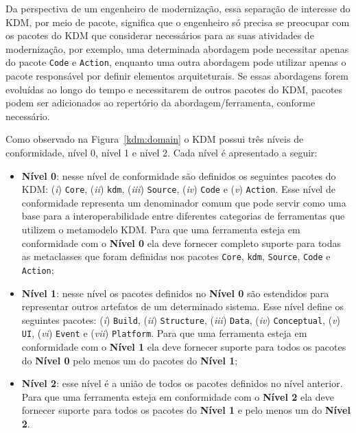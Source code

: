 Da perspectiva de um engenheiro de modernização, essa separação de interesse do KDM, por meio de pacote, significa que o engenheiro só precisa se preocupar com os pacotes do KDM que considerar necessários para as suas atividades de modernização, por exemplo, uma determinada abordagem pode necessitar apenas do pacote \texttt{Code} e \texttt{Action}, enquanto uma outra abordagem pode utilizar apenas o pacote responsável por definir elementos arquiteturais. Se essas abordagens forem evoluídas ao longo do tempo e necessitarem de outros pacotes do KDM, pacotes podem ser adicionados ao repertório da abordagem/ferramenta, conforme necessário.

Como observado na Figura~\ref{kdm:domain} o KDM possui três níveis de conformidade, nível 0, nível 1 e nível 2. Cada nível é apresentado a seguir:

\begin{itemize}
    \item \textbf{Nível 0}: nesse nível de conformidade são definidos os seguintes pacotes do KDM: (\textit{i})     \texttt{Core}, (\textit{ii}) \texttt{kdm}, (\textit{iii}) \texttt{Source}, (\textit{iv}) \texttt{Code} e (\textit{v}) \texttt{Action}. Esse nível de conformidade representa um denominador comum que pode servir como uma base para a interoperabilidade entre diferentes categorias de ferramentas que utilizem o metamodelo KDM. Para que uma ferramenta esteja em conformidade com o \textbf{Nível 0} ela deve fornecer completo suporte para todas as metaclasses que foram definidas nos pacotes \texttt{Core}, \texttt{kdm}, \texttt{Source}, \texttt{Code} e \texttt{Action};
    \item \textbf{Nível 1}: nesse nível os pacotes definidos no \textbf{Nível 0} são estendidos para representar outros artefatos de um determinado sistema. Esse nível define os seguintes pacotes: (\textit{i}) \texttt{Build}, (\textit{ii}) \texttt{Structure}, (\textit{iii}) \texttt{Data}, (\textit{iv}) \texttt{Conceptual}, (\textit{v}) \texttt{UI}, (\textit{vi}) \texttt{Event} e (\textit{vii}) \texttt{Platform}. Para que uma ferramenta esteja em conformidade com o \textbf{Nível 1} ela deve fornecer suporte para todos os pacotes do \textbf{Nível 0} pelo menos um do pacotes do \textbf{Nível 1};
    \item \textbf{Nível 2}: esse nível é a união de todos os pacotes definidos no nível anterior. Para que uma ferramenta esteja em conformidade com o \textbf{Nível 2} ela deve fornecer suporte para todos os pacotes do \textbf{Nível 1} e pelo menos um do \textbf{Nível 2}.
\end{itemize}


